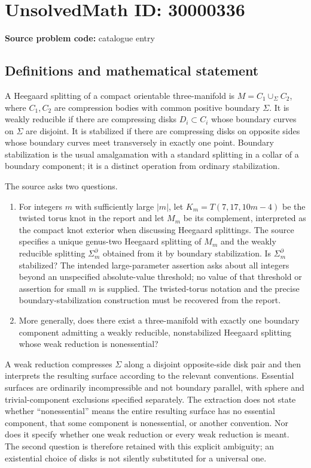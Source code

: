 \documentclass[11pt]{article}
\begin{document}
\section*{UnsolvedMath ID: 30000336}
\textbf{Source problem code:} catalogue entry
\subsection{Definitions and mathematical statement}
A Heegaard splitting of a compact orientable three-manifold is $M=C_1\cup_\Sigma C_2$, where $C_1,C_2$ are compression bodies with common positive boundary $\Sigma$. It is weakly reducible if there are compressing disks $D_i\subset C_i$ whose boundary curves on $\Sigma$ are disjoint. It is stabilized if there are compressing disks on opposite sides whose boundary curves meet transversely in exactly one point. Boundary stabilization is the usual amalgamation with a standard splitting in a collar of a boundary component; it is a distinct operation from ordinary stabilization.

The source asks two questions.
\begin{enumerate}
\item For integers $m$ with sufficiently large $|m|$, let $K_m=T(7,17,10m-4)$ be the twisted torus knot in the report and let $M_m$ be its complement, interpreted as the compact knot exterior when discussing Heegaard splittings. The source specifies a unique genus-two Heegaard splitting of $M_m$ and the weakly reducible splitting $\Sigma_m^{\partial}$ obtained from it by boundary stabilization. Is $\Sigma_m^{\partial}$ stabilized? The intended large-parameter assertion asks about all integers beyond an unspecified absolute-value threshold; no value of that threshold or assertion for small $m$ is supplied. The twisted-torus notation and the precise boundary-stabilization construction must be recovered from the report.
\item More generally, does there exist a three-manifold with exactly one boundary component admitting a weakly reducible, nonstabilized Heegaard splitting whose weak reduction is nonessential?
\end{enumerate}

A weak reduction compresses $\Sigma$ along a disjoint opposite-side disk pair and then interprets the resulting surface according to the relevant conventions. Essential surfaces are ordinarily incompressible and not boundary parallel, with sphere and trivial-component exclusions specified separately. The extraction does not state whether ``nonessential'' means the entire resulting surface has no essential component, that some component is nonessential, or another convention. Nor does it specify whether one weak reduction or every weak reduction is meant. The second question is therefore retained with this explicit ambiguity; an existential choice of disks is not silently substituted for a universal one.
\end{document}
